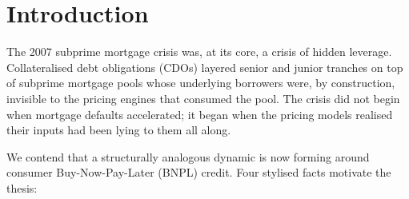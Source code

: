 \documentclass[11pt,letterpaper]{article}
\newcommand{\bsi}{\text{BSI}}
\begin{document}
\begin{abstract}
median on the single day $\bsi$ registers a $+27\sigma$ spike in
response to 12{,}838 BNPL complaints filed on the Regulation~Z
compliance deadline. This across-the-board non-corroboration is the
Subprime-2.0 blind-spot signature. We respond with a BSI-only
super-threshold bypass at $|\bsi_z| \geq 10$, wired into the live
compliance engine; with the bypass armed the \textsc{Reg~Z} window
approves three trading days natively (no counterfactual relaxation
required) and delivers a $+5.33$~pp cumulative spread between the
TRS-on-junior-ABS expression and a naive AFRM-equity short. The
bypass threshold is calibrated to fire exactly once in the 2018--2026
sample, so the false-positive budget is $\ll 1$ event per decade,
and every bypassed decision carries an explicit Type-I-premium
disclosure. All code, data, and figures are reproducible via a
single \texttt{make paper} target on a local machine.

\vspace{0.4em}
\noindent\textbf{Keywords.} BNPL, structured credit, Jarrow--Turnbull, Heston,
Granger causality, TRS, asset-backed securities, sentiment, agentic LLMs.
\end{abstract}


\section{Introduction}
\label{sec:intro}

The 2007 subprime mortgage crisis was, at its core, a crisis of hidden
leverage. Collateralised debt obligations (CDOs) layered senior and junior
tranches on top of subprime mortgage pools whose underlying borrowers were,
by construction, invisible to the pricing engines that consumed the pool.
The crisis did not begin when mortgage defaults accelerated; it began when
the pricing models realised their inputs had been lying to them all along.

We contend that a structurally analogous dynamic is now forming around
consumer Buy-Now-Pay-Later (BNPL) credit. Four stylised facts motivate the
thesis:
\end{document}
